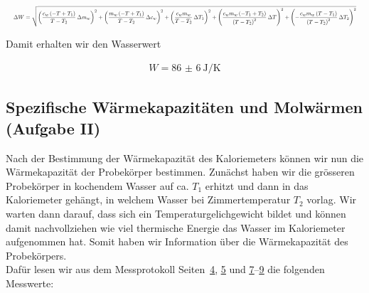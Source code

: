 \documentclass{article}
\newcommand{\mpref}[2]{{\color{linkblue}\uline{\hyperref[#1]{#2}}}}
\begin{document}
  \begin{equation}
	\resizebox{\textwidth}{!}{$\displaystyle
	\Delta W
	= \sqrt{\left(\frac{c_{w} \left(- T + T_{1}\right)}{T - T_{2}}\,\Delta m_{w}\right)^2 + \left(\frac{m_{w} \left(- T + T_{1}\right)}{T - T_{2}}\,\Delta c_{w}\right)^2 + \left(\frac{c_{w} m_{w}}{T - T_{2}}\,\Delta T_{1}\right)^2 + \left(\frac{c_{w} m_{w} \left(- T_{1} + T_{2}\right)}{\left(T - T_{2}\right)^{2}}\,\Delta T\right)^2 + \left(- \frac{c_{w} m_{w} \left(T - T_{1}\right)}{\left(T - T_{2}\right)^{2}}\,\Delta T_{2}\right)^2}
	$}
\end{equation}


Damit erhalten wir den Wasserwert

\begin{equation}
	\boxed{
		\begin{aligned}
			W = \qty{86(6)}{\joule\per\kelvin}
		\end{aligned}
	}
\end{equation}



\subsection{Spezifische Wärmekapazitäten und Molwärmen (Aufgabe II)}
\label{sec:aufg2}

Nach der Bestimmung der Wärmekapazität des Kaloriemeters können wir nun die Wärmekapazität der 
Probekörper bestimmen. Zunächst haben wir die grösseren Probekörper in kochendem Wasser auf ca. 
$T_1$ erhitzt 
und dann in das Kaloriemeter gehängt, in welchem Wasser bei Zimmertemperatur $T_2$ vorlag. Wir 
warten dann darauf, dass sich ein Temperaturgelichgewicht bildet und können damit nachvollziehen
wie viel thermische Energie das Wasser im Kaloriemeter aufgenommen hat. Somit haben wir Information
über die Wärmekapazität des Probekörpers.\\
Dafür lesen wir aus dem Messprotokoll Seiten~\mpref{page:mp-massen}{4}, \mpref{page:mp-wasserwert}{5} und \mpref{page:mp-graphit}{7}--\mpref{page:mp-blei}{9} die folgenden Messwerte:
\end{document}
